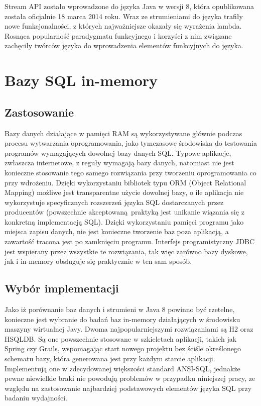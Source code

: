 \documentclass[12pt]{extarticle}
\begin{document}
    Stream API zostało wprowadzone do języka Java w wersji 8, która opublikowana została oficjalnie 18 marca 2014 roku. Wraz ze strumieniami do języka trafiły nowe funkcjonalności, z których najważniejsze okazały się wyrażenia lambda. Rosnąca popularność paradygmatu funkcyjnego i korzyści z nim związane zachęciły twórców języka do wprowadzenia elementów funkcyjnych do języka. 

\section{Bazy SQL in-memory}

\subsection{Zastosowanie}

      Bazy danych działające w pamięci RAM są wykorzystywane głównie podczas procesu wytwarzania oprogramowania, jako tymczasowe środowiska do testowania programów wymagających dowolnej bazy danych SQL. Typowe aplikacje, zwłaszcza internetowe, z reguły wymagają bazy danych, natomiast nie jest konieczne stosowanie tego samego rozwiązania przy tworzeniu oprogramowania co przy wdrożeniu. Dzięki wykorzystaniu bibliotek typu ORM (Object Relational Mapping) możliwe jest transparentne użycie dowolnej bazy, o ile aplikacja nie wykorzystuje specyficznych rozszerzeń języka SQL dostarczanych przez producentów (powszechnie akceptowaną praktyką jest unikanie wiązania się z konkretną implementacją SQL). Dzięki wykorzystaniu pamięci programu jako miejsca zapisu danych, nie jest konieczne tworzenie baz poza aplikacją, a zawartość tracona jest po zamknięciu programu.  Interfejs programistyczny JDBC jest wspierany przez wszystkie te rozwiązania, tak więc zarówno bazy dyskowe, jak i in-memory obsługuje się praktycznie w ten sam sposób. 

\subsection{Wybór implementacji}

    Jako iż porównanie baz danych i strumieni w Java 8 powinno być rzetelne, konieczne jest wybranie do badań baz in-memory działających w środowisku maszyny wirtualnej Javy. Dwoma najpopularniejszymi rozwiązaniami są H2 oraz HSQLDB. Są one powszechnie stosowane w szkieletach aplikacji, takich jak Spring czy Grails, wspomagając start nowego projektu bez ściśle określonego schematu bazy, która generowana jest przy każdym starcie aplikacji. Implementują one w zdecydowanej większości standard ANSI-SQL, jednakże pewne niewielkie braki nie powodują problemów w przypadku niniejszej pracy, ze względu na zastosowanie najbardziej podstawowych elementów języka SQL przy badaniu wydajności. 
\end{document}
